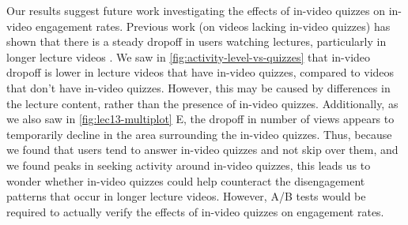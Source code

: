 \documentclass{sigchi}
\begin{document}



Our results suggest future work investigating the effects of in-video quizzes on in-video engagement rates. Previous work (on videos lacking in-video quizzes) has shown that there is a steady dropoff in users watching lectures, particularly in longer lecture videos \cite{juho}. We saw in \autoref{fig:activity-level-vs-quizzes} that in-video dropoff is lower in lecture videos that have in-video quizzes, compared to videos that don't have in-video quizzes. However, this may be caused by differences in the lecture content, rather than the presence of in-video quizzes. Additionally, as we also saw in \autoref{fig:lec13-multiplot} E, the dropoff in number of views appears to temporarily decline in the area surrounding the in-video quizzes. Thus, because we found that users tend to answer in-video quizzes and not skip over them, and we found peaks in seeking activity around in-video quizzes, this leads us to wonder whether in-video quizzes could help counteract the disengagement patterns that occur in longer lecture videos. However, A/B tests would be required to actually verify the effects of in-video quizzes on engagement rates.
\end{document}
